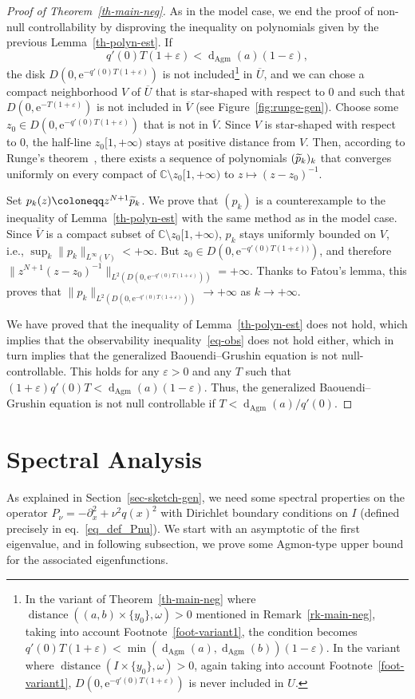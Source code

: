 \documentclass[10pt]{amsart}
\theoremstyle{definition}\newtheorem{defi}[theo]{Definition}\newtheorem{rema}[theo]{Remark}\newtheorem{exam}[theo]{Example}\newtheorem{exem}[theo]{Example}\newtheorem{nota}[theo]{Notation}
\newcommand{\1}{\mathds 1}
\DeclareMathOperator{\distance}{distance}
\newcommand{\dagmon}{\mathop{\mathrm{d}}\nolimits_{\mathrm{Agm}}}
\newcommand{\C}{\mathbb{C}}
\newcommand{\eu}{\mathrm e}
\newcommand{\e}{\varepsilon}
\renewcommand{\o}{\omega}
\let\oldtilde\tilde
\renewcommand*{\tilde}[1]{\mathchoice{\widetilde{#1}}{\widetilde{#1}}{\oldtilde{#1}}{\oldtilde{#1}}}
\begin{document}
\begin{proof}[Proof of Theorem~\ref{th-main-neg}]
As in the model case, we end the proof of non-null controllability by disproving the inequality on polynomials given by the previous Lemma~\ref{th-polyn-est}. If
\[
q'(0)T(1+\e)< \dagmon(a)(1-\e),
\]
the disk $D(0,\eu^{-q'(0)T(1+\e)})$ is not included\footnote{In the variant of Theorem~\ref{th-main-neg} where $\distance((a,b)\times\{y_0\},\o)>0$ mentioned in
Remark~\ref{rk-main-neg}, taking into account Footnote~\ref{foot-variant1}, the condition becomes $q'(0)T(1+\e) < \min(\dagmon(a),\dagmon(b))(1-\e)$. In the variant where $\distance(I\times\{y_0\},\o)>0$, again taking into account
Footnote~\ref{foot-variant1}, $D(0,\eu^{-q'(0)T(1+\e)})$ is never included in $U$.} in $\overline U$, and we can chose a compact neighborhood $V$ of $\overline U$ that is star-shaped with respect to $0$ and such that $D(0,\eu^{-T(1+\e)})$ is not included in $\overline V$ (see
Figure~\ref{fig:runge-gen}). Choose some $z_0\in D(0,\eu^{-q'(0)T(1+\e)})$ that is not in $\overline V$. Since $V$ is star-shaped with respect to $0$, the half-line $z_0[1,+\infty)$ stays at positive distance from $V$. Then, according to Runge's theorem~\cite[Theorem~13.9]{Rudin86}, there exists a sequence of polynomials $(\tilde p_k)_k$ that converges uniformly on every compact of $\C \setminus z_0[1,+\infty)$ to $z\mapsto (z-z_0)^{-1}$.

Set $p_k(z) \coloneqq z^{N+1} \tilde p_k$. We prove that $(p_k)$ is a counterexample to the inequality of Lemma~\ref{th-polyn-est} with the same method as in the model case. Since $\overline V$ is a compact subset of $\C \setminus z_0[1,+\infty)$, $p_k$ stays uniformly bounded on $V$, i.e., $\sup_k \|p_k\|_{L^\infty(V)} < +\infty$. But $z_0 \in D(0,\eu^{-q'(0)T(1+\e))})$, and therefore $\|z^{N+1}(z-z_0)^{-1}\|_{L^2(D(0,\eu^{-q'(0)T(1+\e)}))} = +\infty$. Thanks to Fatou's lemma, this proves that $\|p_k\|_{L^2(D(0,\eu^{-q'(0)T(1+\e)}))} \to +\infty$ as $k\to + \infty$.

We have proved that the inequality of Lemma~\ref{th-polyn-est} does not hold, which implies that the observability inequality~\eqref{eq-obs} does not hold either, which in turn implies that the generalized Baouendi--Grushin equation is not null-controllable. This holds for any $\e>0$ and any $T$ such that $(1+\e)q'(0)T< \dagmon(a)(1-\e)$. Thus, the generalized Baouendi--Grushin equation is not null controllable if $T< \dagmon(a)/q'(0)$.
\end{proof}


\section{Spectral Analysis}\label{sec-spectral}
As explained in Section~\ref{sec-sketch-gen}, we need some spectral properties on the operator $P_\nu = -\partial_x^2 + \nu^2 q(x)^2$ with Dirichlet boundary conditions on $I$ (defined precisely in eq.~\eqref{eq_def_Pnu}). We start with an asymptotic of the first eigenvalue, and in following subsection, we prove some Agmon-type upper bound for the associated eigenfunctions.
\end{document}
